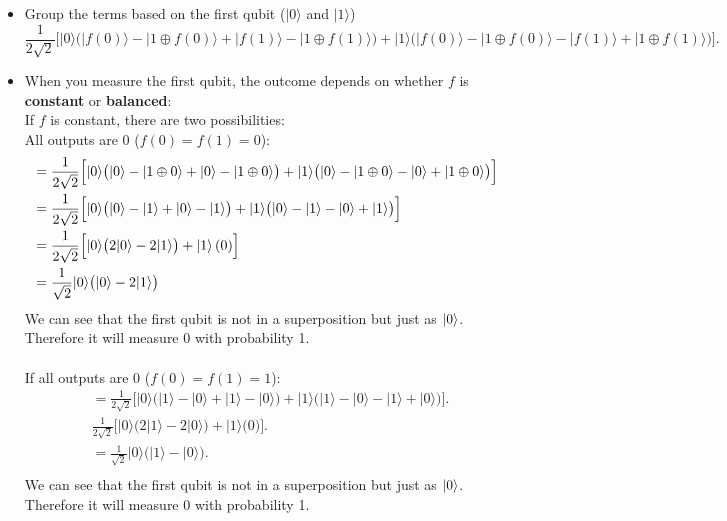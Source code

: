 \documentclass{article}
\begin{document}
\begin{itemize}
    \item Group the terms based on the first qubit (\( |0\rangle \) and \( |1\rangle \))
    $$\frac{1}{2\sqrt{2}} \Big[
    |0\rangle \big( |f(0)\rangle - |1 \oplus f(0)\rangle + |f(1)\rangle - |1 \oplus f(1)\rangle \big) + |1\rangle \big( |f(0)\rangle - |1 \oplus f(0)\rangle - |f(1)\rangle + |1 \oplus f(1)\rangle \big)\Big].$$
    \item When you measure the first qubit, the outcome depends on whether \( f \) is \textbf{constant} or \textbf{balanced}:\\
    If \( f \) is constant, there are two possibilities:\\
    All outputs are \( 0 \) (\( f(0) = f(1) = 0 \)):
    \begin{align*}
        &=\frac{1}{2\sqrt{2}} \Big[
        |0\rangle \big( |0\rangle - |1 \oplus 0\rangle + |0\rangle - |1 \oplus 0\rangle \big) + |1\rangle \big( |0\rangle - |1 \oplus 0\rangle - |0\rangle + |1 \oplus 0\rangle \big)\Big]\\
        &=\frac{1}{2\sqrt{2}} \Big[
        |0\rangle \big( |0\rangle - |1\rangle + |0\rangle - |1\rangle \big) + |1\rangle \big( |0\rangle - |1\rangle - |0\rangle + |1\rangle \big)\Big]\\
        &=\frac{1}{2\sqrt{2}} \Big[
        |0\rangle \big( 2|0\rangle - 2|1\rangle\big) +\ket{1}(0)\Big]\\
        &=\frac{1}{\sqrt{2}}|0\rangle \big( |0\rangle - 2|1\rangle\big)
    \end{align*}
    We can see that the first qubit is not in a superposition but just as $\ket{0}$. Therefore it will measure 0 with probability 1.\\
    \\
    If all outputs are \( 0 \) (\( f(0) = f(1) = 1 \)):
     \begin{align*}
        &= \frac{1}{2\sqrt{2}} \Big[
        |0\rangle \big( |1\rangle - |0\rangle + |1\rangle - |0\rangle \big) 
        + |1\rangle \big( |1\rangle - |0\rangle - |1\rangle + |0\rangle \big)\Big].\\
        &\frac{1}{2\sqrt{2}} \Big[
        |0\rangle \big( 2|1\rangle - 2|0\rangle \big) + |1\rangle \big( 0 \big)\Big].\\
        &=\frac{1}{\sqrt{2}} |0\rangle \big( |1\rangle - |0\rangle \big).\\
    \end{align*}
     We can see that the first qubit is not in a superposition but just as $\ket{0}$. Therefore it will measure 0 with probability 1.\\

\end{itemize}
\end{document}
